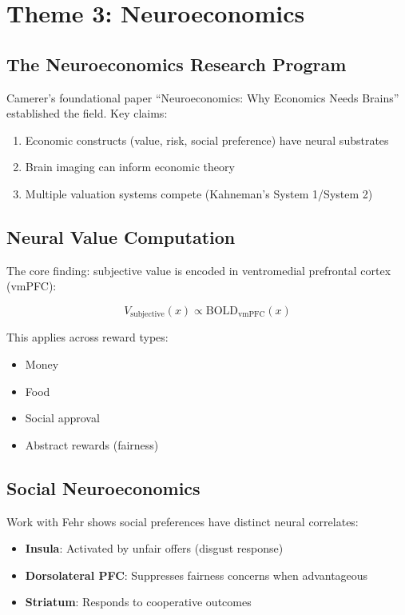 \section{Theme 3: Neuroeconomics}
\label{sec:ca-neuro}

\subsection{The Neuroeconomics Research Program}

Camerer's foundational paper ``Neuroeconomics: Why Economics Needs Brains'' \citep{PAP-camerer2004neuroeconomics} established the field. Key claims:

\begin{enumerate}[nosep]
\item Economic constructs (value, risk, social preference) have neural substrates
\item Brain imaging can inform economic theory
\item Multiple valuation systems compete (Kahneman's System 1/System 2)
\end{enumerate}

\subsection{Neural Value Computation}

The core finding: subjective value is encoded in ventromedial prefrontal cortex (vmPFC):

\begin{equation}
V_{\text{subjective}}(x) \propto \text{BOLD}_{\text{vmPFC}}(x)
\end{equation}

This applies across reward types:
\begin{itemize}[nosep]
\item Money
\item Food
\item Social approval
\item Abstract rewards (fairness)
\end{itemize}

\subsection{Social Neuroeconomics}

Work with Fehr \citep{fehr2007neurobiology} shows social preferences have distinct neural correlates:
\begin{itemize}[nosep]
\item \textbf{Insula}: Activated by unfair offers (disgust response)
\item \textbf{Dorsolateral PFC}: Suppresses fairness concerns when advantageous
\item \textbf{Striatum}: Responds to cooperative outcomes
\end{itemize}


